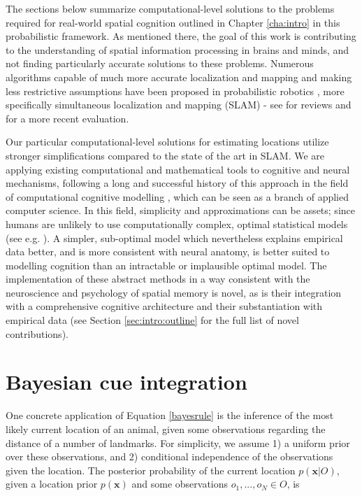 The sections below summarize computational-level solutions to the problems required for real-world spatial cognition outlined in Chapter \ref{cha:intro} in this probabilistic framework. As mentioned there, the goal of this work is contributing to the understanding of spatial information processing in brains and minds, and not finding particularly accurate solutions to these problems. Numerous algorithms capable of much more accurate localization and mapping and making less restrictive assumptions have been proposed in probabilistic robotics \citep{thrun2005probabilistic}, more specifically simultaneous localization and mapping (SLAM) - see \citep{thrun2008simultaneous,durrant2006simultaneous,bailey2006simultaneous} for reviews and \citep{tuna2012evaluations} for a more recent evaluation. 

Our particular computational-level solutions for estimating locations utilize stronger simplifications compared to the state of the art in SLAM. We are applying existing computational and mathematical tools to cognitive and neural mechanisms, following a long and successful history of this approach in the field of computational cognitive modelling \citep{sun2008introduction}, which can be seen as a branch of applied computer science. In this field, simplicity and approximations can be assets; since humans are unlikely to use computationally complex, optimal statistical models (see e.g. \citep{van2008tractable,simon1955behavioral}). A simpler, sub-optimal model which nevertheless explains empirical data better, and is more consistent with neural anatomy, is better suited to modelling cognition than an intractable or implausible optimal model. The implementation of these abstract methods in a way consistent with the neuroscience and psychology of spatial memory is novel, as is their integration with a comprehensive cognitive architecture and their substantiation with empirical data (see Section \ref{sec:intro:outline} for the full list of novel contributions). 

\section{Bayesian cue integration}
\label{sec:bayescue}

One concrete application of Equation \ref{bayesrule} is the inference of the most likely current location of an animal, given some observations regarding the distance of a number of landmarks. For simplicity, we assume 1) a uniform prior over these observations, and 2) conditional independence of the observations given the location. The posterior probability of the current location $p(\bm x | O)$, given a location prior $p(\bm x)$ and some observations $o_1, ..., o_N \in O$, is 

